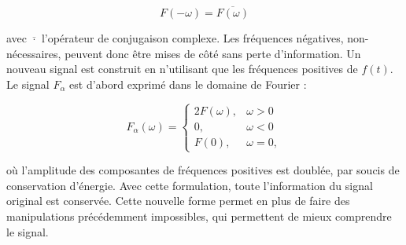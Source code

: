 \begin{equation}
    F(-\omega) = \overline{F(\omega)}
\end{equation}

avec $\overline{\cdot}$ l'opérateur de conjugaison complexe. Les fréquences négatives, non-nécessaires, peuvent donc être mises de côté sans perte d'information. Un nouveau signal est construit en n'utilisant que les fréquences positives de $f(t)$. Le signal $F_{\alpha}$ est d'abord exprimé dans le domaine de Fourier :

\begin{equation}
    F_{\alpha}(\omega) = \left\{
    \begin{array}{ll}
        2F(\omega), & \omega > 0 \\
        0, & \omega < 0 \\
        F(0), & \omega = 0,
    \end{array}
    \right.
\end{equation}

où l'amplitude des composantes de fréquences positives est doublée, par soucis de conservation d'énergie. Avec cette formulation, toute l'information du signal original est conservée. Cette nouvelle forme permet en plus de faire des manipulations précédemment impossibles, qui permettent de mieux comprendre le signal.

